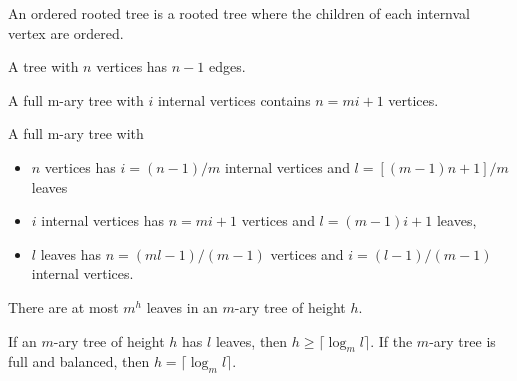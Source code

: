 \documentclass[../discrete.tex]{subfiles}
\begin{document}
An ordered rooted tree is a rooted tree where the children of each internval vertex are ordered.

\begin{theorem}
    A tree with $n$ vertices has $n-1$ edges.
\end{theorem}

\begin{theorem}
    A full m-ary tree with $i$ internal vertices contains $n=mi+1$ vertices.
\end{theorem}

\begin{theorem}
    A full m-ary tree with 
    \begin{itemize}
        \item $n$ vertices has $i=(n-1)/m$ internal vertices and $l=[(m-1)n+1]/m$ leaves 
        \item $i$ internal vertices has $n=mi+1$ vertices and $l=(m-1)i+1$ leaves, 
        \item $l$ leaves has $n=(ml-1)/(m-1)$ vertices and $i=(l-1)/(m-1)$ internal vertices.
    \end{itemize}
\end{theorem}

\begin{theorem}
    There are at most $m^h$ leaves in an $m$-ary tree of height $h$.
\end{theorem}

\begin{corollary}
    If an $m$-ary tree of height $h$ has $l$ leaves, then $h\geq \lceil \log_m l \rceil$. If the $m$-ary tree is full and balanced, 
    then $h=\lceil \log_m l\rceil$.
\end{corollary}
\end{document}

